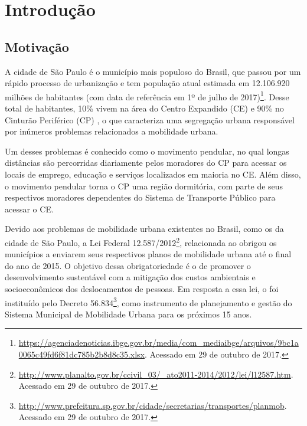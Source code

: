 \documentclass[
	12pt,				%
	oneside,			%
	a4paper,			%
	english,			%
	brazil				%
	]{abntex2ppgsi}
\begin{document}
\chapter{Introdução}
\label{introducao}


\section{Motivação}
\label{motivation}

A cidade de São Paulo é o município mais populoso do Brasil, que passou por um rápido processo de urbanização e tem população atual estimada em 12.106.920 milhões de habitantes (com data de referência em 1º de julho de 2017)\footnote{\url{https://agenciadenoticias.ibge.gov.br/media/com\_mediaibge/arquivos/9bc1a0065c49fd6f81dc785b2b8d8c35.xlsx}. Acessado em 29 de outubro de 2017.}.
Desse total de habitantes, 10\% vivem na área do 
{Centro Expandido (CE)} e 90\% no 
{Cinturão Periférico (CP)}  \cite{SA201722}, o que caracteriza uma segregação urbana responsável por inúmeros problemas relacionados a mobilidade urbana.

Um desses problemas é conhecido como o movimento pendular, no qual longas distâncias são percorridas diariamente pelos moradores do CP para acessar os locais de emprego, educação e serviços localizados em maioria no CE. Além disso, o movimento pendular torna o CP  uma região dormitória, com parte de seus respectivos moradores dependentes do Sistema de Transporte Público para acessar o CE.

Devido aos problemas de mobilidade urbana existentes no Brasil, como os da cidade de São Paulo, a Lei Federal 12.587/2012\footnote{\url{http://www.planalto.gov.br/ccivil\_03/\_ato2011-2014/2012/lei/l12587.htm}. Acessado em 29 de outubro de 2017.}, relacionada ao  obrigou os municípios a enviarem seus respectivos planos de mobilidade urbana até o final do ano de 2015.  O objetivo dessa obrigatoriedade é o de promover o desenvolvimento sustentável com a mitigação dos custos ambientais e socioeconômicos dos deslocamentos de pessoas. Em resposta a essa lei, o  foi instituído pelo Decreto 56.834\footnote{\label{planmob}\url{http://www.prefeitura.sp.gov.br/cidade/secretarias/transportes/planmob}. Acessado em 29 de outubro de 2017.}, como instrumento de planejamento e gestão do Sistema Municipal de Mobilidade Urbana para os próximos 15 anos.
\end{document}
